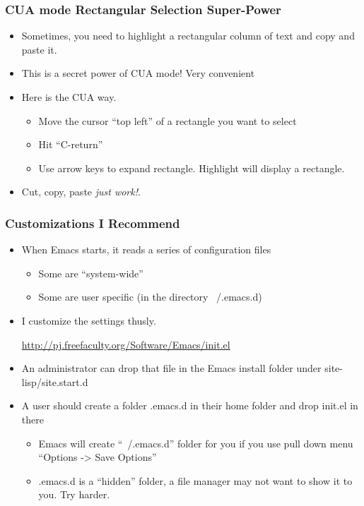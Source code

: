 \documentclass[11pt,english]{beamer}
\begin{document}
\begin{frame}
  \frametitle{CUA mode Rectangular Selection Super-Power}
  \begin{itemize}
  \item Sometimes, you need to highlight a rectangular column of text
    and copy and paste it.
  \item This is a secret power of CUA mode! Very convenient
  \item Here is the CUA way.

    \begin{itemize}
    \item Move the cursor ``top left'' of a rectangle you want to select
    \item Hit ``C-return''
    \item Use arrow keys to expand rectangle. Highlight will display a rectangle.
    \end{itemize}
  \item Cut, copy, paste \emph{just work!}.
  \end{itemize}
\end{frame}

\begin{frame}[containsverbatim]
  \frametitle{Customizations I Recommend}
  \begin{itemize}
  \item When Emacs starts, it reads a series of configuration files

    \begin{itemize}
    \item Some are ``system-wide''
    \item Some are user specific (in the directory ~/.emacs.d)
    \end{itemize}
  \item I customize the settings thusly.  

    \url{http://pj.freefaculty.org/Software/Emacs/init.el}

  \item An administrator can drop that file in the Emacs install
    folder under site-lisp/site.start.d
  \item A user should create a folder .emacs.d in their home folder
    and drop init.el in there

    \begin{itemize}
    \item Emacs will create ``~/.emacs.d'' folder for you if you use
      pull down menu ``Options -> Save Options''
    \item .emacs.d is a ``hidden'' folder, a file manager may not want
      to show it to you.  Try harder.
    \end{itemize}
  \end{itemize}
\end{frame}
\end{document}
